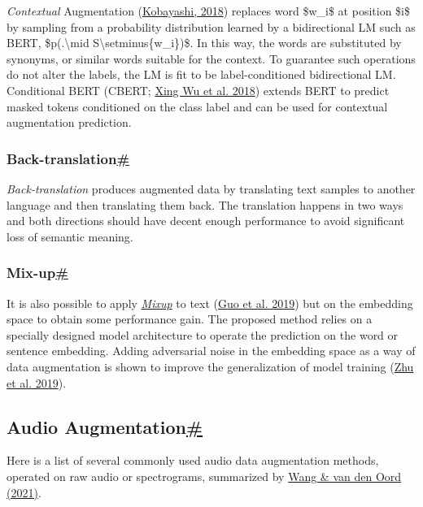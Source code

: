 \emph{Contextual} Augmentation (\href{https://arxiv.org/abs/1805.06201}{Kobayashi, 2018}) replaces word \$w\_i\$ at position \$i\$ by sampling from a probability distribution learned by a bidirectional LM such as BERT, \$p(.\textbackslash mid S\textbackslash setminus\{w\_i\})\$. In this way, the words are substituted by synonyms, or similar words suitable for the context. To guarantee such operations do not alter the labels, the LM is fit to be label-conditioned bidirectional LM. Conditional BERT (CBERT; \href{https://arxiv.org/abs/1812.06705}{Xing Wu et al. 2018}) extends BERT to predict masked tokens conditioned on the class label and can be used for contextual augmentation prediction.

\subsubsection{\texorpdfstring{Back-translation\hyperref[back-translation]{\#}}{Back-translation\#}}\label{back-translation}

\emph{Back-translation} produces augmented data by translating text samples to another language and then translating them back. The translation happens in two ways and both directions should have decent enough performance to avoid significant loss of semantic meaning.

\subsubsection{\texorpdfstring{Mix-up\hyperref[mix-up]{\#}}{Mix-up\#}}\label{mix-up}

It is also possible to apply \hyperref[image-mixture]{\emph{Mixup}} to text (\href{https://arxiv.org/abs/1905.08941}{Guo et al. 2019}) but on the embedding space to obtain some performance gain. The proposed method relies on a specially designed model architecture to operate the prediction on the word or sentence embedding. Adding adversarial noise in the embedding space as a way of data augmentation is shown to improve the generalization of model training (\href{https://arxiv.org/abs/1909.11764}{Zhu et al. 2019}).

\subsection{\texorpdfstring{Audio Augmentation\hyperref[audio-augmentation]{\#}}{Audio Augmentation\#}}\label{audio-augmentation}

Here is a list of several commonly used audio data augmentation methods, operated on raw audio or spectrograms, summarized by \href{https://arxiv.org/abs/2103.06508}{Wang \& van den Oord (2021)}.

